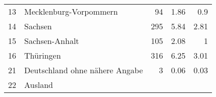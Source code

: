 \begin{longtable}{lXrrr}
     13 &
     \multicolumn{1}{X}{ Mecklenburg-Vorpommern   } &


       \num{94} &
       \num[round-mode=places,round-precision=2]{1.86} &
         \num[round-mode=places,round-precision=2]{0.9} \\

     14 &
     \multicolumn{1}{X}{ Sachsen   } &


       \num{295} &
       \num[round-mode=places,round-precision=2]{5.84} &
         \num[round-mode=places,round-precision=2]{2.81} \\

     15 &
     \multicolumn{1}{X}{ Sachsen-Anhalt   } &


       \num{105} &
       \num[round-mode=places,round-precision=2]{2.08} &
         \num[round-mode=places,round-precision=2]{1} \\

     16 &
     \multicolumn{1}{X}{ Thüringen   } &


       \num{316} &
       \num[round-mode=places,round-precision=2]{6.25} &
         \num[round-mode=places,round-precision=2]{3.01} \\

     21 &
     \multicolumn{1}{X}{ Deutschland ohne nähere Angabe   } &


       \num{3} &
       \num[round-mode=places,round-precision=2]{0.06} &
         \num[round-mode=places,round-precision=2]{0.03} \\

     22 &
     \multicolumn{1}{X}{ Ausland   } &



\end{longtable}

